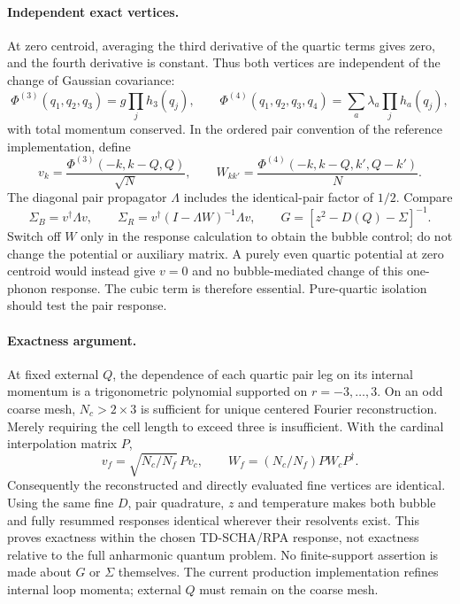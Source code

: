 \documentclass[11pt]{article}
\begin{document}
\paragraph{Independent exact vertices.}
At zero centroid, averaging the third derivative of the quartic terms
gives zero, and the fourth derivative is constant. Thus both vertices
are independent of the change of Gaussian covariance:
\[
 \Phi^{(3)}(q_1,q_2,q_3)=g\prod_j h_3(q_j),\qquad
 \Phi^{(4)}(q_1,q_2,q_3,q_4)=\sum_a\lambda_a\prod_j h_a(q_j),
\]
with total momentum conserved. In the ordered pair convention of the
reference implementation, define
\[
 v_k=\frac{\Phi^{(3)}(-k,k-Q,Q)}{\sqrt N},\qquad
 W_{kk'}=\frac{\Phi^{(4)}(-k,k-Q,k',Q-k')}{N}.
\]
The diagonal pair propagator $\Lambda$ includes the identical-pair factor
of $1/2$. Compare
\[
 \Sigma_B=v^\dagger\Lambda v,\qquad
 \Sigma_R=v^\dagger(I-\Lambda W)^{-1}\Lambda v,\qquad
 G=[z^2-D(Q)-\Sigma]^{-1}.
\]
Switch off $W$ only in the response calculation to obtain the bubble
control; do not change the potential or auxiliary matrix. A purely even
quartic potential at zero centroid would instead give $v=0$ and no
bubble-mediated change of this one-phonon response. The cubic term is
therefore essential. Pure-quartic isolation should test the pair response.

\paragraph{Exactness argument.}
At fixed external $Q$, the dependence of each quartic pair leg on its
internal momentum is a trigonometric polynomial supported on
$r=-3,\ldots,3$. On an odd coarse mesh, $N_c>2\times3$ is sufficient
for unique centered Fourier reconstruction. Merely requiring the cell
length to exceed three is insufficient. With the cardinal interpolation
matrix $P$,
\[
 v_f=\sqrt{N_c/N_f}\,Pv_c,\qquad
 W_f=(N_c/N_f)PW_cP^\dagger.
\]
Consequently the reconstructed and directly evaluated fine vertices
are identical. Using the same fine $D$, pair quadrature, $z$ and temperature
makes both bubble and fully resummed responses identical wherever their
resolvents exist. This proves exactness within the chosen TD-SCHA/RPA
response, not exactness relative to the full anharmonic quantum problem.
No finite-support assertion is made about $G$ or $\Sigma$ themselves.
The current production implementation refines internal loop momenta;
external $Q$ must remain on the coarse mesh.
\end{document}
